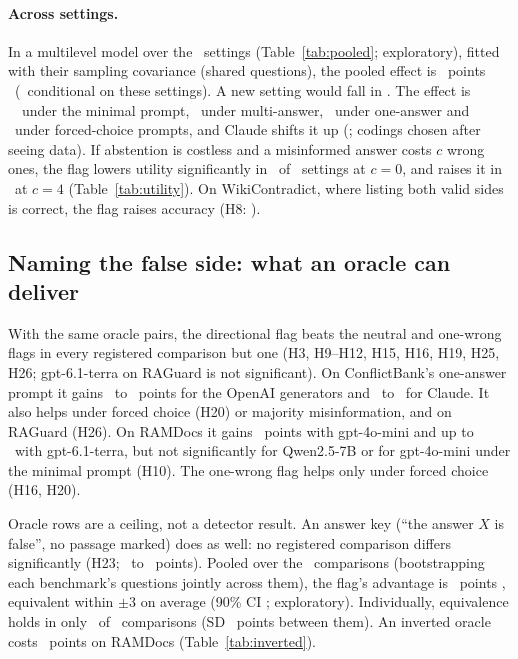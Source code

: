 \paragraph{Across settings.} In a multilevel model over the \neuMlK\ settings (Table~\ref{tab:pooled}; exploratory),
fitted with their sampling covariance (shared questions), the pooled effect is \neuMlMu\ points
\neuMlCI\ (\neuMlCIDesign\ conditional on these settings). A new setting would fall in \neuMlPI. The effect is
\neuPolMinimal\ \neuPolMinimalCI\ under the minimal prompt, \neuPolMulti\ under
multi-answer, \neuPolSingle\ under one-answer and \neuPolForced\ under forced-choice prompts, and Claude
shifts it up (\neuMlAnthropic; codings chosen after seeing data). If abstention is costless and a misinformed answer
costs $c$ wrong ones, the flag lowers utility significantly in \nUtilSixNegZero\ of \nUtilSixSettings\ settings at
$c=0$, and raises it in \nUtilSixPosFour\ at $c=4$ (Table~\ref{tab:utility}). On WikiContradict, where listing both valid sides is
correct, the flag raises accuracy (H8: \wikiOracleFlag).

\subsection{Naming the false side: what an oracle can deliver}
\label{sec:direction}
With the same oracle pairs, the directional flag beats the neutral and one-wrong flags in every registered comparison
but one (H3, H9--H12, H15, H16, H19, H25, H26; gpt-6.1-terra on RAGuard is not significant). On ConflictBank's
one-answer prompt it gains \azSgTerraOracleFlagDirectionalConflict\ to \azSgLunaOracleFlagDirectionalConflict\
points for the OpenAI generators and \azSgSonnetOracleFlagDirectionalConflict\ to
\azSgHaikuOracleFlagDirectionalConflict\ for Claude. It also helps under forced choice (H20) or majority
misinformation, and on RAGuard (H26). On RAMDocs it gains \adOracleDirConf\ points with gpt-4o-mini and
up to \azRdTerraOracleFlagDirectionalConflict\ with gpt-6.1-terra, but not significantly for Qwen2.5-7B or for
gpt-4o-mini under the minimal prompt (H10). The one-wrong flag helps only under forced choice (H16, H20).

Oracle rows are a ceiling, not a detector result. An answer key (``the answer $X$ is false'', no passage
marked) does as well: no registered comparison differs significantly (H23; \keyDiffMin\ to \keyDiffMax\ points).
Pooled over the \PoolTwentyThreeK\ comparisons (bootstrapping each benchmark's questions
jointly across them), the flag's advantage is \PoolTwentyThree\ points \PoolTwentyThreeCI, equivalent within $\pm$3 on average
(90\% CI \PoolTwentyThreeCINinety; exploratory). Individually, equivalence holds in only \hTwentyThreeEqN\ of
\hTwentyThreeK\ comparisons (SD \hTwentyThreeTau\ points between them). An inverted oracle
costs \aadvDirConf\ points on RAMDocs (Table~\ref{tab:inverted}).

